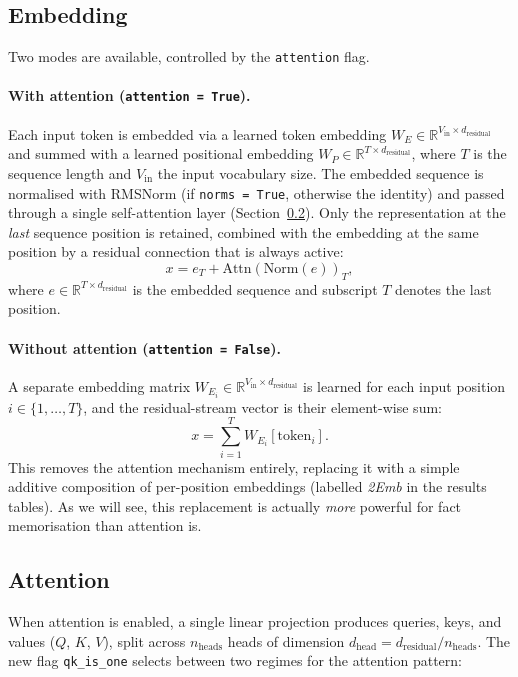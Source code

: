 \documentclass[11pt,a4paper]{article}
\begin{document}
\subsection{Embedding}
\label{sec:embedding}

Two modes are available, controlled by the \texttt{attention} flag.

\paragraph{With attention (\texttt{attention = True}).}
Each input token is embedded via a learned token embedding $W_E \in \mathbb{R}^{V_\text{in} \times d_\text{residual}}$ and summed with a learned positional embedding $W_P \in \mathbb{R}^{T \times d_\text{residual}}$, where $T$ is the sequence length and $V_\text{in}$ the input vocabulary size. The embedded sequence is normalised with RMSNorm (if \texttt{norms = True}, otherwise the identity) and passed through a single self-attention layer (Section~\ref{sec:attention}). Only the representation at the \emph{last} sequence position is retained, combined with the embedding at the same position by a residual connection that is always active:
\[
    x = e_T + \text{Attn}\!\left(\text{Norm}(e)\right)_T,
\]
where $e \in \mathbb{R}^{T \times d_\text{residual}}$ is the embedded sequence and subscript $T$ denotes the last position.

\paragraph{Without attention (\texttt{attention = False}).}
A separate embedding matrix $W_{E_i} \in \mathbb{R}^{V_\text{in}\times d_\text{residual}}$ is learned for each input position $i \in \{1,\dots,T\}$, and the residual-stream vector is their element-wise sum:
\[
    x = \sum_{i=1}^{T} W_{E_i}[\text{token}_i].
\]
This removes the attention mechanism entirely, replacing it with a simple additive composition of per-position embeddings (labelled \emph{2Emb} in the results tables). As we will see, this replacement is actually \emph{more} powerful for fact memorisation than attention is.

\subsection{Attention}
\label{sec:attention}

When attention is enabled, a single linear projection produces queries, keys, and values ($Q$, $K$, $V$), split across $n_\text{heads}$ heads of dimension $d_\text{head} = d_\text{residual} / n_\text{heads}$. The new flag \texttt{qk\_is\_one} selects between two regimes for the attention pattern:
\end{document}
